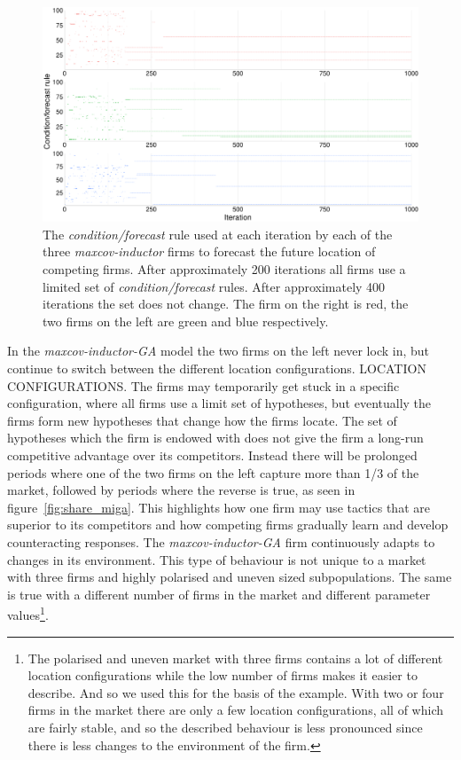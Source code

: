 \documentclass[preprint, 12pt]{elsarticle}
\newcommand*{\TODO}{\textbf{\fbox{??}}}%
\begin{document}
\begin{figure}[ht!]
	\centering
	\includegraphics[width=\textwidth]{Graphics/fig5cf_mi.pdf}
	\caption{The \emph{condition/forecast} rule used at each iteration by each of the three \emph{maxcov-inductor} firms to forecast the future location of competing firms. After approximately 200 iterations all firms use a limited set of \emph{condition/forecast} rules. After approximately 400 iterations the set does not change. The firm on the right is red, the two firms on the left are green and blue respectively.}
	\label{fig:cf}
\end{figure}

In the \emph{maxcov-inductor-GA} model the two firms on the left never lock in, but continue to switch between the different location configurations. \TODO{LOCATION CONFIGURATIONS.} The firms may temporarily get stuck in a specific configuration, where all firms use a limit set of hypotheses, but eventually the firms form new hypotheses that change how the firms locate. The set of hypotheses which the firm is endowed with does not give the firm a long-run competitive advantage over its competitors. Instead there will be prolonged periods where one of the two firms on the left capture more than 1/3 of the market, followed by periods where the reverse is true, as seen in figure~\ref{fig:share_miga}. This highlights how one firm may use tactics that are superior to its competitors and how competing firms gradually learn and develop counteracting responses. The \emph{maxcov-inductor-GA} firm continuously adapts to changes in its environment. This type of behaviour is not unique to a market with three firms and highly polarised and uneven sized subpopulations. The same is true with a different number of firms in the market and different parameter values\footnote{The polarised and uneven market with three firms contains a lot of different location configurations while the low number of firms makes it easier to describe. And so we used this for the basis of the example. With two or four firms in the market there are only a few location configurations, all of which are fairly stable, and so the described behaviour is less pronounced since there is less changes to the environment of the firm.}. 
\end{document}
